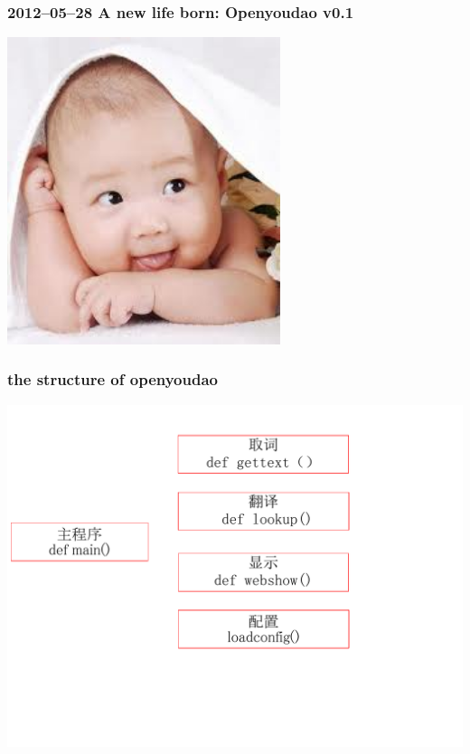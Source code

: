 \documentclass[10pt]{beamer}
\begin{document}
\begin{frame}
  \frametitle{2012--05--28 A new life born: Openyoudao v0.1}

\begin{center} 
  \includegraphics[width=0.6\textwidth]{newlife.jpg}
\href{run:youdao-v0.1.mp4}{}

\end{center}

\end{frame}

\begin{frame}
  \frametitle{the structure  of openyoudao}
\begin{center} 
  \includegraphics[width=1.1\textwidth]{construct.pdf}

\end{center}

\end{frame}
\end{document}
